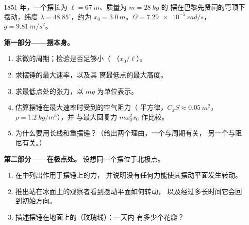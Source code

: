 \begin{problem}
\label{pb:b1:non-inertial-frames:1}
1851 年，一个摆长为 $\ell = \qty{67}{m}$、质量为 $m = \qty{28}{kg}$ 的
摆在巴黎先贤祠的穹顶下摆动，纬度 $\lambda =
48.85^\circ$，约为 $x_0 = \qty{3.0}{m}$。$\Omega =
\qty{7.29e-5}{rad/s}$，$g = \qty{9.81}{m/s^2}$。

\medskip
\noindent\textbf{第一部分——摆本身。}
\begin{enumerate}
  \item 求微的周期；检验是否足够小（
        （$x_0/\ell$）。
  \item 求摆锤的最大速率，以及其
        离最低点的最大高度。
  \item 求最低点处的张力，以 $mg$ 为单位表示。
  \item 估算摆锤在最大速率时受到的空气阻力（
        平方律，$C_xS \approx \qty{0.05}{m^2}$，$\rho = \qty{1.2}{kg/m^3}$），并
        与最大回复力 $m\omega_0^2x_0$ 作比较。
  \item 为什么要用长线和重摆锤？（给出两个理由，一个与周期有关，
        另一个与阻尼有关。）
\end{enumerate}

\medskip
\noindent\textbf{第二部分——在极点处。}
设想同一个摆位于北极点。
\begin{enumerate}[resume]
  \item 在中列出作用于摆锤上的力，
        并说明没有任何力能使其摆动平面发生转动。
  \item 推出站在冰面上的观察者看到摆动平面如何转动，
        以及经过多长时间它会回到初始方向。
  \item 描述摆锤在地面上的（玫瑰线）：一天内
        有多少个花瓣？
\end{enumerate}


\end{problem}
